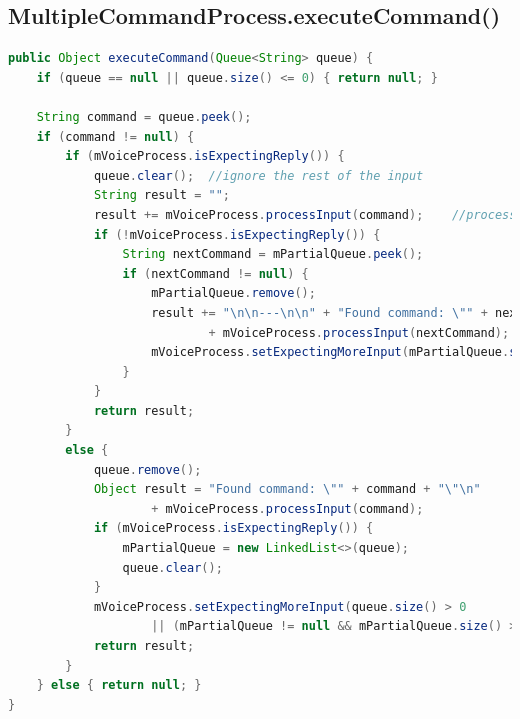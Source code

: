 \documentclass[12pt]{article}
\begin{document}
\subsection{MultipleCommandProcess.executeCommand()}
\label{appendix:multiple-commands-execute}
\begin{lstlisting}[language=Java, caption=MultipleCommandProcess.executeCommand()]
public Object executeCommand(Queue<String> queue) {
    if (queue == null || queue.size() <= 0) { return null; }

    String command = queue.peek();
    if (command != null) {
        if (mVoiceProcess.isExpectingReply()) {
            queue.clear();  //ignore the rest of the input
            String result = "";
            result += mVoiceProcess.processInput(command);    //process confirmation
            if (!mVoiceProcess.isExpectingReply()) {
                String nextCommand = mPartialQueue.peek();
                if (nextCommand != null) {
                    mPartialQueue.remove();
                    result += "\n\n---\n\n" + "Found command: \"" + nextCommand + "\"\n"
                            + mVoiceProcess.processInput(nextCommand);
                    mVoiceProcess.setExpectingMoreInput(mPartialQueue.size() > 0);
                }
            }
            return result;
        }
        else {
            queue.remove();
            Object result = "Found command: \"" + command + "\"\n"
                    + mVoiceProcess.processInput(command);
            if (mVoiceProcess.isExpectingReply()) {
                mPartialQueue = new LinkedList<>(queue);
                queue.clear();
            }
            mVoiceProcess.setExpectingMoreInput(queue.size() > 0
                    || (mPartialQueue != null && mPartialQueue.size() > 0));
            return result;
        }
    } else { return null; }
}
\end{lstlisting}

\newpage
{}

\end{document}

